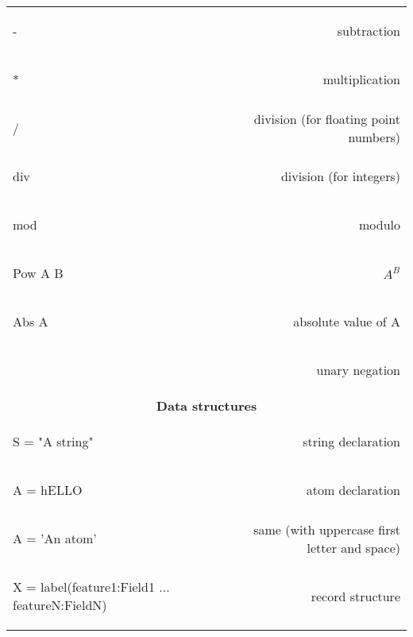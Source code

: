 \documentclass[12pt]{article}
\begin{document}
\begin{longtable}{l r}
\begin{oz}
-
\end{oz}
&subtraction\\
 
\begin{oz}
*
\end{oz}
&multiplication\\
 
\begin{oz}
/
\end{oz}
&division (for floating point numbers)\\
 
\begin{oz}
div
\end{oz}
&division (for integers)\\
 
\begin{oz}
mod
\end{oz}
&modulo\\
 
\begin{oz}
{Pow A B}
\end{oz}
&$A^{B}$\\
 
\begin{oz}
{Abs A}
\end{oz}
&absolute value of A\\

\begin{oz}
~
\end{oz}
&unary negation\\[0.4em]
 


\multicolumn{2}{c}{\textbf{Data structures}}\\

\begin{oz}
S = "A string"
\end{oz}
& string declaration\\

\begin{oz}
A = hELLO
\end{oz}
& atom declaration\\

\begin{oz}
A = 'An atom'
\end{oz}
& same (with uppercase first letter and space)\\



\begin{oz}
X = label(feature1:Field1 
		... 
	  featureN:FieldN)
\end{oz}
&record structure \\


\end{longtable}
\end{document}
